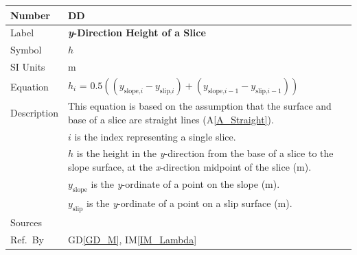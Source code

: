 \documentclass[12pt]{article}
\newcommand{\colAwidth}{0.13\textwidth}
\newcommand{\colBwidth}{0.82\textwidth}
\newcommand{\aref}[1]{A\ref{#1}}
\renewcommand{\arraystretch}{1}
\newcommand{\iref}[1]{IM\ref{#1}}
\newcounter{datadefnum} %
\newcounter{defnum} %
\newcommand{\dref}[1]{GD\ref{#1}}
\begin{document}
\noindent
\begin{minipage}{\textwidth}
	\renewcommand*{\arraystretch}{1.6}
	\begin{tabular}{| p{\colAwidth} | p{\colBwidth} |}
		
		\hline \rowcolor[gray]{0.9} Number&
		DD{datadefnum}\thedatadefnum \label{DD_h}\\
		
		\hline Label& \bf \textit{y}-Direction Height of a Slice \\
		\hline Symbol& $h$\\
		\hline SI Units& \si{\meter}\\
		
		\hline
		Equation & 
		$h_i$ = $0.5(({y_{\text{slope,}i}}-{y_{\text{slip,}i}}) + 
		({y_{\text{slope,}i-1}}-{y_{\text{slip,}i-1}}))$\\
		
		\hline Description &This equation is based on the assumption that the 
		surface and base of a slice are straight lines (\aref{A_Straight}).\\
		&$i$ is the index representing a single slice.\\
		&$h$ is the height in the \textit{y}-direction from the base of a slice 
		to the slope surface, at the \textit{x}-direction midpoint of the slice
		(\si{\meter}).\\
		&${y_{\text{slope}}}$ is the \textit{y}-ordinate of a point on the 
		slope (\si{\meter}).\\
		&${y_{\text{slip}}}$ is the \textit{y}-ordinate of a point on a slip 
		surface (\si{\meter}).\\
		
		\hline Sources& \cite{FredlundKrahn}\\
		
		\hline Ref.\ By & \dref{GD_M}, \iref{IM_Lambda}\\
		
		\hline
	\end{tabular}
\end{minipage}\\


~\newline

\end{document}
